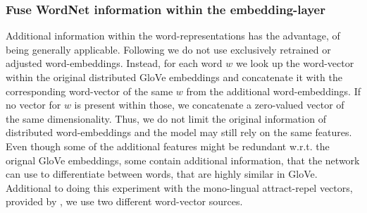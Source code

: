 \subsubsection{Fuse WordNet information within the embedding-layer}
Additional information within the word-representations has the advantage, of being generally applicable. Following \cite{ruckle2018concatenated} we do not use exclusively retrained or adjusted word-embeddings. Instead, for each word $w$ we look up the word-vector within the original distributed GloVe embeddings and concatenate it with the corresponding word-vector of the same $w$ from the additional word-embeddings. If no vector for $w$ is present within those, we concatenate a zero-valued vector of the same dimensionality. Thus, we do not limit the original information of distributed word-embeddings and the model may still rely on the same features. Even though some of the additional features might be redundant w.r.t. the orignal GloVe embeddings, some contain additional information, that the network can use to differentiate between words, that are highly similar in GloVe. Additional to doing this experiment with the mono-lingual attract-repel vectors, provided by \cite{ruckle2018concatenated}, we use two different word-vector sources.

